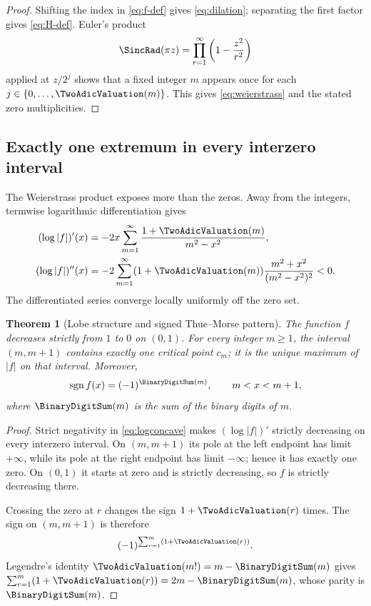\documentclass[11pt,oneside]{article}
\newtheorem{theorem}{Theorem}[section]
\theoremstyle{definition}
\theoremstyle{remark}
\begin{document}
\begin{proof}
Shifting the index in \eqref{eq:f-def} gives \eqref{eq:dilation}; separating
the first factor gives \eqref{eq:H-def}.  Euler's product
\[
 \SincRad(\pi z)=\prod_{r=1}^{\infty}\left(1-\frac{z^2}{r^2}\right)
\]
applied at $z/2^j$ shows that a fixed integer $m$ appears once for each
$j\in\{0,\ldots,\TwoAdicValuation(m)\}$.  This gives \eqref{eq:weierstrass} and the stated
zero multiplicities.
\end{proof}

\subsection{Exactly one extremum in every interzero interval}

The Weierstrass product exposes more than the zeros.  Away from the integers,
termwise logarithmic differentiation gives
\begin{align}
 (\log|f|)'(x)
 &=-2x\sum_{m=1}^{\infty}
   \frac{1+\TwoAdicValuation(m)}{m^2-x^2},
 \label{eq:logder}\\
 (\log|f|)''(x)
 &=-2\sum_{m=1}^{\infty}(1+\TwoAdicValuation(m))
   \frac{m^2+x^2}{(m^2-x^2)^2}<0.
 \label{eq:logconcave}
\end{align}
The differentiated series converge locally uniformly off the zero set.

\begin{theorem}[Lobe structure and signed Thue--Morse pattern]
\label{thm:lobes}
The function $f$ decreases strictly from $1$ to $0$ on $(0,1)$.  For every
integer $m\ge1$, the interval $(m,m+1)$ contains exactly one critical point
$c_m$; it is the unique maximum of $|f|$ on that interval.  Moreover,
\begin{equation}
 \operatorname{sgn}f(x)=(-1)^{\BinaryDigitSum(m)},
 \qquad m<x<m+1,
 \label{eq:TM-sign}
\end{equation}
where $\BinaryDigitSum(m)$ is the sum of the binary digits of $m$.
\end{theorem}

\begin{proof}
Strict negativity in \eqref{eq:logconcave} makes $(\log|f|)'$ strictly
decreasing on every interzero interval.  On $(m,m+1)$ its pole at the left
endpoint has limit $+\infty$, while its pole at the right endpoint has limit
$-\infty$; hence it has exactly one zero.  On $(0,1)$ it starts at zero and is
strictly decreasing, so $f$ is strictly decreasing there.

Crossing the zero at $r$ changes the sign $1+\TwoAdicValuation(r)$ times.  The sign on
$(m,m+1)$ is therefore
\[
 (-1)^{\sum_{r=1}^{m}(1+\TwoAdicValuation(r))}.
\]
Legendre's identity $\TwoAdicValuation(m!)=m-\BinaryDigitSum(m)$ gives
$\sum_{r=1}^{m}(1+\TwoAdicValuation(r))=2m-\BinaryDigitSum(m)$, whose parity is $\BinaryDigitSum(m)$.
\end{proof}
\end{document}
